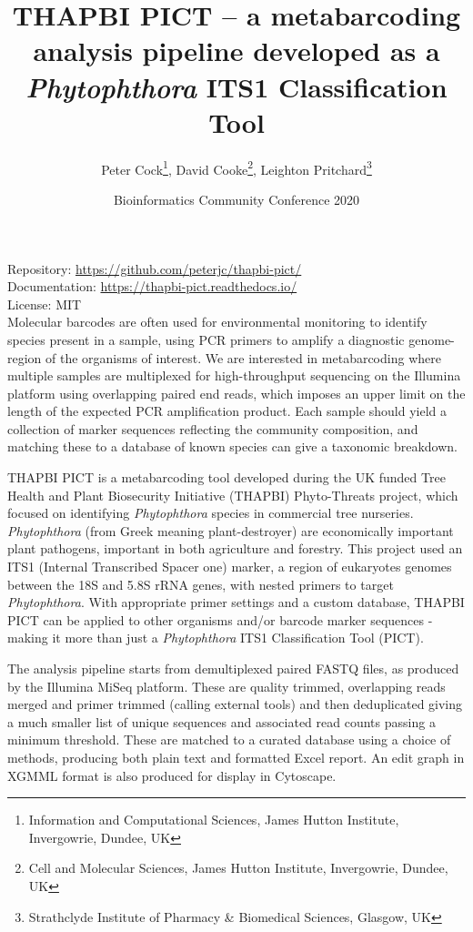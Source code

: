 \documentclass[10pt,oneside]{article}
\title{THAPBI PICT -- a metabarcoding analysis pipeline developed as a \textit{Phytophthora} ITS1 Classification Tool}
\author{
  Peter Cock\thanks{Information and Computational Sciences, James Hutton Institute, Invergowrie, Dundee, UK},
  David Cooke\thanks{Cell and Molecular Sciences, James Hutton Institute, Invergowrie, Dundee, UK},
  Leighton Pritchard\thanks{Strathclyde Institute of Pharmacy \& Biomedical Sciences, Glasgow, UK}
}
\date{Bioinformatics Community Conference 2020}
\begin{document}
\maketitle
\thispagestyle{empty}

\vspace{-0.2in}
\noindent
Repository: \url{https://github.com/peterjc/thapbi-pict/} \\
Documentation: \url{https://thapbi-pict.readthedocs.io/} \\
License: MIT \\

Molecular barcodes are often used for environmental monitoring to identify species present in a sample, using PCR primers to amplify a diagnostic genome-region of the organisms of interest. We are interested in metabarcoding where multiple samples are multiplexed for high-throughput sequencing on the Illumina platform using overlapping paired end reads, which imposes an upper limit on the length of the expected PCR amplification product. Each sample should yield a collection of marker sequences reflecting the community composition, and matching these to a database of known species can give a taxonomic breakdown.

THAPBI PICT is a metabarcoding tool developed during the UK funded Tree Health and Plant Biosecurity Initiative (THAPBI) Phyto-Threats project, which focused on identifying \textit{Phytophthora} species in commercial tree nurseries. \textit{Phytophthora} (from Greek meaning plant-destroyer) are economically important plant pathogens, important in both agriculture and forestry. This project used an ITS1 (Internal Transcribed Spacer one) marker, a region of eukaryotes genomes between the 18S and 5.8S rRNA genes, with nested primers to target \textit{Phytophthora}. With appropriate primer settings and a custom database, THAPBI PICT can be applied to other organisms and/or barcode marker sequences - making it more than just a \textit{Phytophthora} ITS1 Classification Tool (PICT).

The analysis pipeline starts from demultiplexed paired FASTQ files, as produced by the Illumina MiSeq platform. These are quality trimmed, overlapping reads merged and primer trimmed (calling external tools) and then deduplicated giving a much smaller list of unique sequences and associated read counts passing a minimum threshold. These are matched to a curated database using a choice of methods, producing both plain text and formatted Excel report. An edit graph in XGMML format is also produced for display in Cytoscape.
\end{document}
